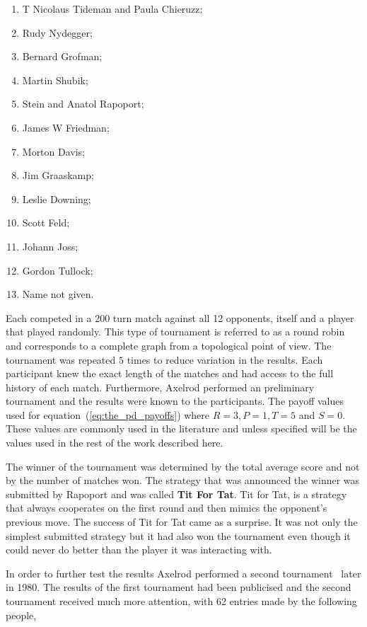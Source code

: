 \documentclass{article}
\theoremstyle{definition}
\begin{document}
\begin{multicols}{2}
    \begin{enumerate}
        \item T Nicolaus Tideman and Paula Chieruzz;
        \item Rudy Nydegger;
        \item Bernard Grofman;
        \item Martin Shubik;
        \item Stein and Anatol Rapoport;
        \item James W Friedman;
        \item Morton Davis;
        \item Jim Graaskamp;
        \item Leslie Downing;
        \item Scott Feld;
        \item Johann Joss;
        \item Gordon Tullock;
        \item Name not given.
    \end{enumerate}
\end{multicols}

Each competed in a 200 turn match against all 12 opponents, itself and a player
that played randomly. This type of tournament is referred to as a round robin and
corresponds to a complete graph from a topological point of view. The tournament
was repeated \(5\) times to reduce variation in the results. Each participant knew
the exact length of the matches and had access to the full history of each match.
Furthermore, Axelrod performed an preliminary tournament and the results were known
to the participants. The payoff values used for equation~(\ref{eq:the_pd_payoffs}) where
\(R=3, P=1, T=5\) and \(S=0\). These values are commonly used in the literature
and unless specified will be the values used in the rest of the work described here.

The winner of the tournament was determined by the total average score and not by
the number of matches won. The strategy that was announced the winner was
submitted by Rapoport and was called \textbf{Tit For Tat}. Tit for Tat, is a
strategy that always cooperates on the first round and then mimics the opponent's
previous move.
The success of Tit for Tat came as a surprise. It was not only the simplest submitted
strategy but it had also won the tournament even though it could never do better
than the player it was interacting with.

In order to further test the results Axelrod performed a second
tournament~\cite{Axelrod1980b} later in 1980. The results of the first tournament
had been publicised and the second tournament received much more attention, with 62 entries
made by the following people,
\end{document}
